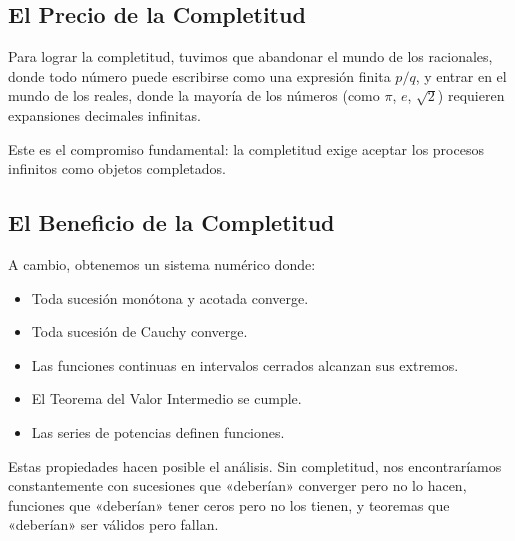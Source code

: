 \subsection{El Precio de la Completitud}

Para lograr la completitud, tuvimos que abandonar el mundo de los racionales, donde
todo número puede escribirse como una expresión finita $p/q$, y entrar en el mundo
de los reales, donde la mayoría de los números (como $\pi$, $e$, $\sqrt{2}$)
requieren expansiones decimales infinitas.

Este es el compromiso fundamental: la completitud exige aceptar los procesos
infinitos como objetos completados.

\subsection{El Beneficio de la Completitud}

A cambio, obtenemos un sistema numérico donde:
\begin{itemize}
  \item Toda sucesión monótona y acotada converge.
  \item Toda sucesión de Cauchy converge.
  \item Las funciones continuas en intervalos cerrados alcanzan sus extremos.
  \item El Teorema del Valor Intermedio se cumple.
  \item Las series de potencias definen funciones.
\end{itemize}
Estas propiedades hacen posible el análisis. Sin completitud, nos encontraríamos
constantemente con sucesiones que «deberían» converger pero no lo hacen, funciones
que «deberían» tener ceros pero no los tienen, y teoremas que «deberían» ser válidos
pero fallan.

